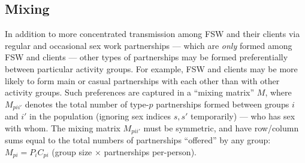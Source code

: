 \subsection{Mixing}\label{model.par.mix}
In addition to more concentrated transmission
among FSW and their clients via regular and occasional sex work partnerships
--- which are \emph{only} formed among FSW and clients ---
other types of partnerships may be formed
preferentially between particular activity groups.
For example, FSW and clients may be more likely to form main or casual partnerships
with each other than with other activity groups.
Such preferences are captured in a ``mixing matrix'' $M$, where $M_{pii'}$ denotes
the total number of type-$p$ partnerships formed between groups $i$ and $i'$ in the population
(ignoring sex indices $s,s'$ temporarily)
--- \ie who has sex with whom.
The mixing matrix $M_{pii'}$ must be symmetric,
and have row/column sums equal to the total numbers of partnerships ``offered'' by any group:
$M_{pi} = P_{i} C_{pi}$ (group size $\times$ partnerships per-person).
